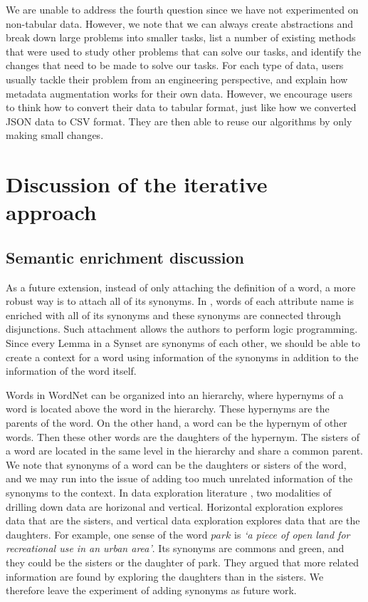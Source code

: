 We are unable to address the fourth question since we have not experimented on non-tabular data. However, we note that we can always create abstractions and break down large problems into smaller tasks, list a number of existing methods that were used to study other problems that can solve our tasks, and identify the changes that need to be made to solve our tasks. For each type of data, users usually tackle their problem from an engineering perspective, and explain how metadata augmentation works for their own data. However, we encourage users to think how to convert their data to tabular format, just like how we converted JSON data to CSV format. They are then able to reuse our algorithms by only making small changes.

\section{Discussion of the iterative approach}
\label{sec:DiscussionOfTheIterativeApproach}

\subsection{Semantic enrichment discussion}

As a future extension, instead of only attaching the definition of a word, a more robust way is to attach all of its synonyms. In \cite{Giunchiglia2005Semantic}, words of each attribute name is enriched with all of its synonyms and these synonyms are connected through disjunctions. Such attachment allows the authors to perform logic programming. Since every Lemma in a Synset are synonyms of each other, we should be able to create a context for a word using information of the synonyms in addition to the information of the word itself.

Words in WordNet can be organized into an hierarchy, where hypernyms of a word is located above the word in the hierarchy. These hypernyms are the parents of the word. On the other hand, a word can be the hypernym of other words. Then these other words are the daughters of the hypernym. The sisters of a word are located in the same level in the hierarchy and share a common parent. We note that synonyms of a word can be the daughters or sisters of the word, and we may run into the issue of adding too much unrelated information of the synonyms to the context. In data exploration literature \cite{10.14778/3021924.3021935}, two modalities of drilling down data are horizonal and vertical. Horizontal exploration explores data that are the sisters, and vertical data exploration explores data that are the daughters. For example, one sense of the word $park$ is \textit{`a piece of open land for recreational use in an urban area'}. Its synonyms are commons and green, and they could be the sisters or the daughter of park. They argued that more related information are found by exploring the daughters than in the sisters. We therefore leave the experiment of adding synonyms as future work.

